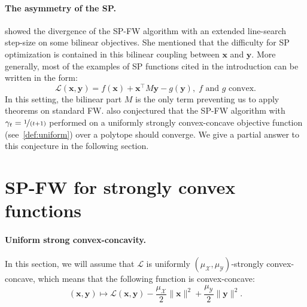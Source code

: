 \documentclass[twoside]{article}
\renewcommand{\L}{\mathcal{L}}
\newcommand{\X}{\mathcal{X}}
\newcommand{\Y}{\mathcal{Y}}
\newcommand{\x}{\bm{x}}
\newcommand{\y}{\bm{y}}
\newcommand{\stepsize}{\gamma}
\newcommand{\0}{\mathbf{0}} %
\begin{document}
%


%
%
%


\paragraph{The asymmetry of the SP.} %
\label{par:the_asymmetry_of_the_sp}
\citet[p.~165]{hammond1984solving} showed the divergence of the SP-FW algorithm with an extended line-search step-size on some bilinear objectives. She mentioned that the difficulty for SP optimization is contained in this bilinear coupling between $\x$ and $\y$.  
More generally, most of the examples of SP functions cited in the introduction can be written in the form:
\begin{equation}
\L(\x,\y) = f(\x) + \x^\top \!M \y - g(\y), \; \text{$f$ and $g$ convex.}
\end{equation}
In this setting, the bilinear part $M$ is the only term preventing us to apply theorems on standard FW.  
\citet[p.~175]{hammond1984solving} also conjectured that the SP-FW algorithm with $\stepsize_t=\nicefrac{1}{(t+1)}$ performed on a uniformly strongly convex-concave objective function (see~\eqref{def:uniform}) over a polytope should converge. We give a partial answer to this conjecture in the following section.
%


%
%
%


\section{SP-FW for strongly convex functions}
\label{sec:SP-FW_strong_convexity}
\paragraph{Uniform strong convex-concavity.} %
\label{par:strong_convex_concavity}
%
In this section, we will assume that $\L$ is uniformly $(\mu_\X,\mu_\Y)$-strongly convex-concave, which means that the following function is convex-concave:
\begin{equation}\label{def:uniform}
 (\x,\y) \mapsto \L(\x,\y) - \frac{\mu_\X}{2} \|\x\|^2 + \frac{\mu_\Y}{2}\|\y\|^2.
\end{equation}
\end{document}
